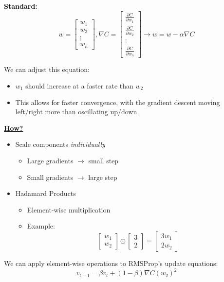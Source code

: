 \textbf{Standard:} \[ w =
\begin{bmatrix}
w_1 \\
w_2 \\
\vdots \\
w_n
\end{bmatrix}, \nabla C = \begin{bmatrix}
    \frac{\partial C}{\partial w_1} \\
\frac{\partial C}{\partial w_2} \\
\vdots \\
\frac{\partial C}{\partial w_n}
\end{bmatrix}
\rightarrow
w=w -\alpha\nabla C
\]

We can adjust this equation:
\begin{itemize}
    \item $w_1$ should increase at a faster rate than $w_2$
    \item This allows for faster convergence, with the gradient descent moving left/right more than oscillating up/down
\end{itemize}
\underline{\textbf{How?}}
\begin{itemize}
    \item Scale components \textit{individually}
    \begin{itemize}
        \item Large gradients $\rightarrow$ small step
        \item Small gradients $\rightarrow$ large step
    \end{itemize}
    \item Hadamard Products
    \begin{itemize}
        \item Element-wise multiplication
        \item Example: \\
        \[
        \begin{bmatrix}
            w_1 \\
            w_2
        \end{bmatrix} \odot 
        \begin{bmatrix}
            3 \\
            2
        \end{bmatrix} =
        \begin{bmatrix}
            3w_1 \\
            2w_2
        \end{bmatrix}
        \]
    \end{itemize}
    
\end{itemize}
We can apply element-wise operations to RMSProp's update equations:
\[
v_{t+1} = \beta v_t + (1-\beta) \nabla C(w_2)^2
\]

